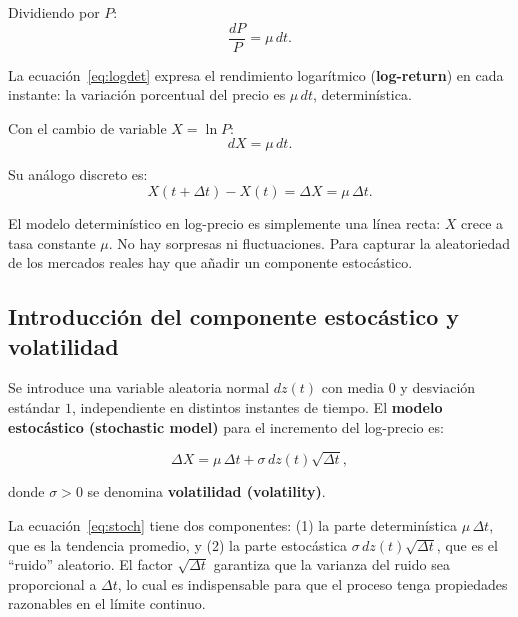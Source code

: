 \documentclass[12pt]{article}
\begin{document}
Dividiendo por $P$:
\begin{equation}
  \frac{dP}{P} = \mu\,dt.
  \label{eq:logdet}
\end{equation}

\begin{intuicionmat}
La ecuaci\'on~\eqref{eq:logdet} expresa el rendimiento logar\'itmico
(\textbf{log-return}) en cada instante: la variaci\'on porcentual del precio
es $\mu\,dt$, determin\'istica.
\end{intuicionmat}

Con el cambio de variable $X = \ln P$:
\begin{equation}
  dX = \mu\,dt.
  \label{eq:logX}
\end{equation}

Su an\'alogo discreto es:
\begin{equation}
  X(t + \Delta t) - X(t) = \Delta X = \mu\,\Delta t.
  \label{eq:disc}
\end{equation}

\begin{intuicion}
El modelo determin\'istico en log-precio es simplemente una l\'inea recta:
$X$ crece a tasa constante $\mu$. No hay sorpresas ni fluctuaciones.
Para capturar la aleatoriedad de los mercados reales hay que a\~nadir un componente
estoc\'astico.
\end{intuicion}

\subsection{Introducci\'on del componente estoc\'astico y volatilidad}

Se introduce una variable aleatoria normal $dz(t)$ con media $0$ y
desviaci\'on est\'andar $1$, independiente en distintos instantes de tiempo.
El \textbf{modelo estoc\'astico (stochastic model)} para el incremento del log-precio es:

\begin{equation}
  \Delta X = \mu\,\Delta t + \sigma\,dz(t)\sqrt{\Delta t},
  \label{eq:stoch}
\end{equation}

donde $\sigma > 0$ se denomina \textbf{volatilidad (volatility)}.

\begin{intuicionmat}
La ecuaci\'on~\eqref{eq:stoch} tiene dos componentes: (1) la parte determin\'istica
$\mu\,\Delta t$, que es la tendencia promedio, y (2) la parte estoc\'astica
$\sigma\,dz(t)\sqrt{\Delta t}$, que es el ``ruido'' aleatorio. El factor
$\sqrt{\Delta t}$ garantiza que la varianza del ruido sea proporcional a $\Delta t$,
lo cual es indispensable para que el proceso tenga propiedades razonables en el
l\'imite continuo.
\end{intuicionmat}
\end{document}
